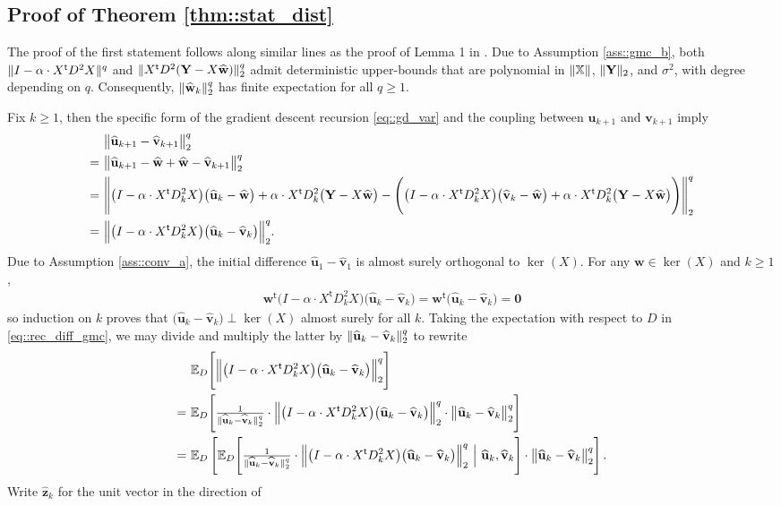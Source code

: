 \documentclass{article}
\newcommand*{\E}{\mathbb{E}} %
\newcommand*{\bbX}{\mathbb{X}}
\newcommand*{\bfY}{\mathbf{Y}}
\newcommand*{\bfu}{\mathbf{u}}
\newcommand*{\bfv}{\mathbf{v}}
\newcommand*{\bfw}{\mathbf{w}}
\newcommand*{\bfz}{\mathbf{z}}
\newcommand*{\bfzero}{\mathbf{0}}
\newcommand*{\tran}{^{\mathsf{t}}}
\newcommand*{\Bigmid}{\ \Big\vert\ }
\DeclarePairedDelimiter{\norm}{\lVert}{\rVert}
\newcommand{\whweight}{\widehat{\bfw}}
\newcommand{\whu}{\widehat{\bfu}}
\newcommand{\whv}{\widehat{\bfv}}
\begin{document}
\subsection{Proof of Theorem \ref{thm::stat_dist}}

The proof of the first statement follows along similar lines as the proof of
Lemma 1 in \cite{li_schmidt-hieber_et_al_2024}. Due to Assumption
\ref{ass::gmc_b}, both $\norm{I - \alpha \cdot X\tran D^2 X}^q$ and
$\norm{X\tran D^2 (\bfY - X \whweight)}_2^q$ admit deterministic upper-bounds
that are polynomial in $\norm{\bbX}$, $\norm{\bfY}_2$, and $\sigma^2$, with
degree depending on $q$. Consequently, $\norm{\whweight_k}_2^q$ has finite
expectation for all $q \geq 1$.

Fix $k \geq 1$, then the specific form of the gradient descent recursion
\eqref{eq::gd_var} and the coupling between $\bfu_{k + 1}$ and $\bfv_{k + 1}$
imply \begin{align}
  &\norm[\big]{\whu_{k + 1} - \whv_{k + 1}}_2^q \nonumber\\
  =\ &\norm[\big]{\whu_{k + 1} - \whweight + \whweight - \whv_{k + 1}}_2^q
  \nonumber\\
  =\ &\norm[\Bigg]{\big(I - \alpha \cdot X\tran D_k^2 X\big) \big(\whu_k -
  \whweight\big) + \alpha \cdot X\tran D_k^2 \big(\bfY - X \whweight\big) -
  \Bigg(\big(I - \alpha \cdot X\tran D_k^2 X\big) \big(\whv_k - \whweight\big) +
  \alpha \cdot X\tran D_k^2 \big(\bfY - X \whweight\big)\Bigg)}_2^q \nonumber\\
  =\ &\norm[\Big]{\big(I - \alpha \cdot X\tran D_k^2 X\big) \big(\whu_k -
  \whv_k\big)}_2^q. \label{eq::rec_diff_gmc}
\end{align} Due to Assumption \ref{ass::conv_a}, the initial difference $\whu_1
- \whv_1$ is almost surely orthogonal to $\ker(X)$. For any $\bfw \in \ker(X)$
and $k \geq 1$, \begin{align*}
  \bfw\tran \big(I - \alpha \cdot X\tran D_k^2 X\big) \big(\whu_k - \whv_k\big)
  = \bfw\tran \big(\whu_k - \whv_k\big) = \bfzero
\end{align*} so induction on $k$ proves that $\big(\whu_k - \whv_k\big) \perp
\ker(X)$ almost surely for all $k$. Taking the expectation with respect to $D$
in \eqref{eq::rec_diff_gmc}, we may divide and multiply the latter by
$\norm{\whu_k - \whv_k}^q_2$ to rewrite \begin{align*}
  &\E_D\Bigg[\norm[\Big]{\big(I - \alpha \cdot X\tran D_k^2 X\big) \big(\whu_k
  - \whv_k\big)}_2^q\Bigg]\\
  =\ &\E_D\Bigg[\tfrac{1}{\norm{\whu_k - \whv_k}^q_2} \cdot \norm[\Big]{\big(I -
  \alpha \cdot X\tran D_k^2 X\big) \big(\whu_k - \whv_k\big)}_2^q \cdot
  \norm[\big]{\whu_k - \whv_k}^q_2\Bigg]\\
  =\ &\E_D\left[\E_D\Bigg[\tfrac{1}{\norm{\whu_k - \whv_k}^q_2} \cdot
  \norm[\Big]{\big(I - \alpha \cdot X\tran D_k^2 X\big) \big(\whu_k -
  \whv_k\big)}_2^q \Bigmid \whu_k, \whv_k \Bigg] \cdot
  \norm[\big]{\whu_k - \whv_k}^q_2 \right].
\end{align*} Write $\widehat{\bfz}_k$ for the unit vector in the direction of
\end{document}
